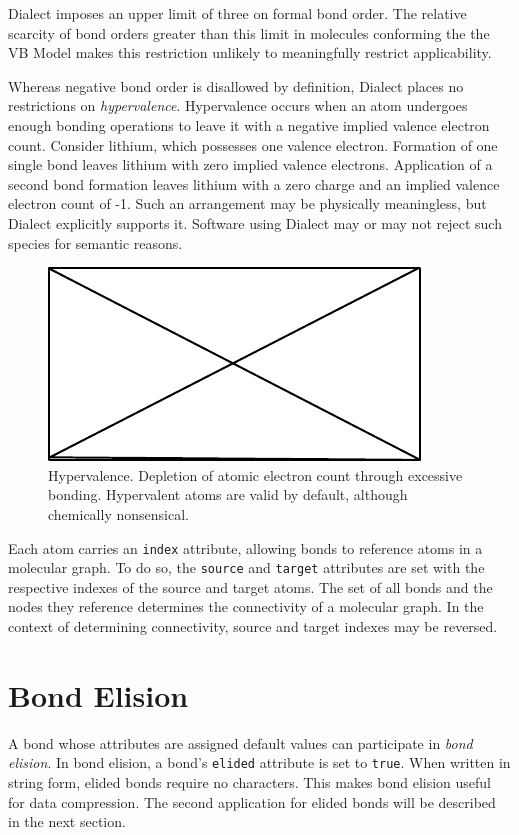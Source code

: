 \documentclass{article}
\def\ttt{\texttt}
\begin{document}
Dialect imposes an upper limit of three on formal bond order. The relative scarcity of bond orders greater than this limit in molecules conforming the the VB Model makes this restriction unlikely to meaningfully restrict applicability.

Whereas negative bond order is disallowed by definition, Dialect places no restrictions on \textit{hypervalence}. Hypervalence occurs when an atom undergoes enough bonding operations to leave it with a negative implied valence electron count. Consider lithium, which possesses one valence electron. Formation of one single bond leaves lithium with zero implied valence electrons. Application of a second bond formation leaves lithium with a zero charge and an implied valence electron count of -1. Such an arrangement may be physically meaningless, but Dialect explicitly supports it. Software using Dialect may or may not reject such species for semantic reasons.

\begin{figure}
    \centering
    \includegraphics{filler}
    \caption{Hypervalence. Depletion of atomic electron count through excessive bonding. Hypervalent atoms are valid by default, although chemically nonsensical.}
    \label{fig:hypervalence}
\end{figure}

Each atom carries an \ttt{index} attribute, allowing bonds to reference atoms in a molecular graph. To do so, the \ttt{source} and \ttt{target} attributes are set with the respective indexes of the source and target atoms. The set of all bonds and the nodes they reference determines the connectivity of a molecular graph. In the context of determining connectivity, source and target indexes may be reversed.

\section*{Bond Elision}

A bond whose attributes are assigned default values can participate in \textit{bond elision}. In bond elision, a bond's \ttt{elided} attribute is set to \ttt{true}. When written in string form, elided bonds require no characters. This makes bond elision useful for data compression. The second application for elided bonds will be described in the next section.
\end{document}
